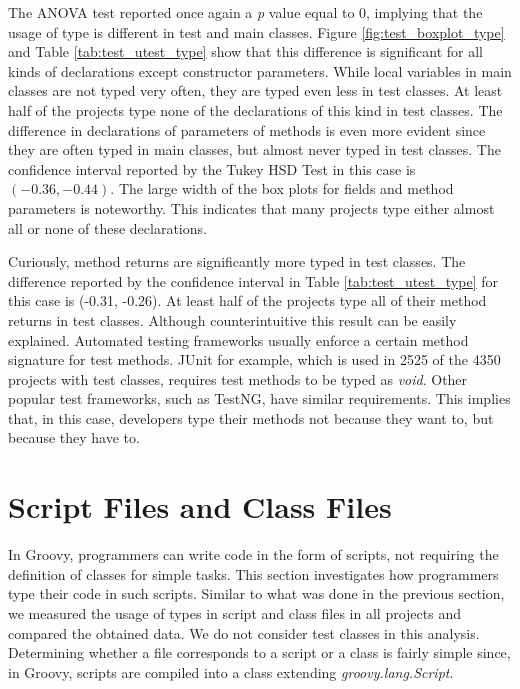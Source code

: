 \documentclass[msc]{ppgccufmg}
\begin{document}
The ANOVA test reported once again a \emph{p} value equal to 0, implying that the usage of type is different in test and main classes.
Figure \ref{fig:test_boxplot_type} and Table \ref{tab:test_utest_type} show that this difference is significant for all kinds of declarations except constructor parameters.
While local variables in main classes are not typed very often, they are typed even less in test classes.
At least half of the projects type none of the declarations of this kind in test classes.
The difference in declarations of parameters of methods is even more evident since they are often typed in main classes, but almost never typed in test classes.
The confidence interval reported by the Tukey HSD Test in this case is $(-0.36, -0.44)$.
The large width of the box plots for fields and method parameters is noteworthy.
This indicates that many projects type either almost all or none of these declarations.

Curiously, method returns are significantly more typed in test classes.
The difference reported by the confidence interval in Table \ref{tab:test_utest_type} for this case is (-0.31, -0.26).
At least half of the projects type all of their method returns in test classes.
Although counterintuitive this result can be easily explained.
Automated testing frameworks usually enforce a certain method signature for test methods.
JUnit for example, which is used in 2525 of the 4350 projects with test classes, requires test methods to be typed as \emph{void}.
Other popular test frameworks, such as TestNG, have similar requirements.
This implies that, in this case, developers type their methods not because they want to, but because they have to.





\section{Script Files and Class Files\label{sec:results-scripts}}
In Groovy, programmers can write code in the form of scripts, not requiring the definition of classes for simple tasks.
This section investigates how programmers type their code in such scripts.
Similar to what was done in the previous section, we measured the usage of types in script and class files in all projects and compared the obtained data.
We do not consider test classes in this analysis.
Determining whether a file corresponds to a script or a class is fairly simple since, in Groovy, scripts are compiled into a class extending \emph{groovy.lang.Script}.
\end{document}
